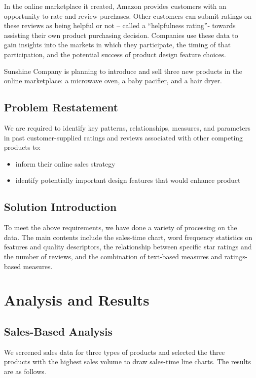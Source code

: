 \documentclass{mcmthesis}
\begin{document}
	In the online marketplace it created, Amazon provides customers with an opportunity to rate and review purchases. Other customers can submit ratings on these reviews as being helpful or not – called a “helpfulness rating”- towards assisting their own product purchasing decision. Companies use these data to gain insights into the markets in which they participate, the timing of that participation, and the potential success of product design feature choices.
	
	Sunshine Company is planning to introduce and sell three new products in the online marketplace: a microwave oven, a baby pacifier, and a hair dryer.
	
	\subsection{Problem Restatement}
	
	We are required to  identify key patterns, relationships, measures, and parameters in past customer-supplied ratings and reviews associated with other competing products to:
	\begin{itemize}
		\item 
		inform their online sales strategy
		\item
		identify potentially important design features that would enhance product
	\end{itemize}
	
	\subsection{Solution Introduction}
	
	To meet the above requirements, we have done a variety of processing on the data. The main contents include the sales-time chart, word frequency statistics on features and quality descriptors, the relationship between specific star ratings and the number of reviews, and the combination of text-based measures and ratings-based measures.
	
	\section{Analysis and Results}
	
	\subsection{Sales-Based Analysis}
	We screened sales data for three types of products and selected the three products with the highest sales volume to draw sales-time line charts. The results are as follows.
	
\end{document}
